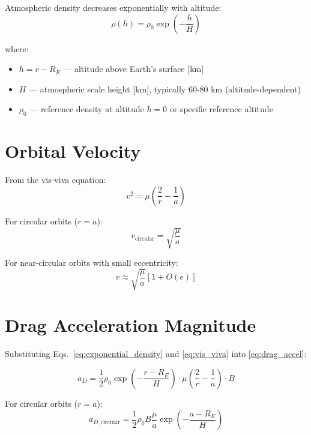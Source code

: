 \documentclass[11pt]{article}
\begin{document}
Atmospheric density decreases exponentially with altitude:
\begin{equation}
\boxed{\rho(h) = \rho_0 \exp\left(-\frac{h}{H}\right)}
\label{eq:exponential_density}
\end{equation}

where:
\begin{itemize}
    \item $h = r - R_E$ — altitude above Earth's surface [km]
    \item $H$ — atmospheric scale height [km], typically 60-80 km (altitude-dependent)
    \item $\rho_0$ — reference density at altitude $h=0$ or specific reference altitude
\end{itemize}

\section{Orbital Velocity}

From the vis-viva equation:
\begin{equation}
v^2 = \mu\left(\frac{2}{r} - \frac{1}{a}\right)
\label{eq:vis_viva}
\end{equation}

For circular orbits ($r = a$):
\begin{equation}
v_{\text{circular}} = \sqrt{\frac{\mu}{a}}
\end{equation}

For near-circular orbits with small eccentricity:
\begin{equation}
v \approx \sqrt{\frac{\mu}{a}}\left[1 + O(e)\right]
\end{equation}

\section{Drag Acceleration Magnitude}

Substituting Eqs.~\eqref{eq:exponential_density} and \eqref{eq:vis_viva} into \eqref{eq:drag_accel}:

\begin{equation}
a_D = \frac{1}{2}\rho_0 \exp\left(-\frac{r - R_E}{H}\right) \cdot \mu\left(\frac{2}{r} - \frac{1}{a}\right) \cdot B
\end{equation}

For circular orbits ($r = a$):
\begin{equation}
\boxed{a_{D,\text{circular}} = \frac{1}{2}\rho_0 B \frac{\mu}{a} \exp\left(-\frac{a - R_E}{H}\right)}
\label{eq:drag_circular}
\end{equation}
\end{document}
